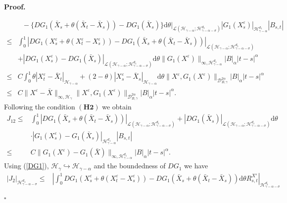 \documentclass[10pt,a4paper]{article}
\numberwithin{equation}{section}
\newenvironment{proof}[1][\normalfont\bfseries Proof]{%
	\noindent #1.\hspace{0.5em}%
	\ignorespaces%
}{%
	\hfill $\square$%
	\par%
}
\begin{document}
\begin{proof}
\begin{align}
		&~~~-\{ DG_1(\bar{X}_s+\theta (\bar{X}_t-\bar{X}_s))-DG_1(\bar{X}_s)\} \mathrm{d} \theta \bigg|_{\mathcal L(\mathcal H_{\gamma-\alpha};\mathcal H_{\gamma-\alpha-\sigma}^{d_1})} |G_1(X_s^\varepsilon)|_{\mathcal H_{\gamma-\alpha}^{d_1} }  |B_{s,t}|   \nonumber\\	
		\leq &  \int_0^1 | DG_1(X_s^\varepsilon+\theta (X_t^\varepsilon-X_s^\varepsilon))-DG_1(\bar{X}_s+\theta (\bar{X}_t-\bar{X}_s)) |_{\mathcal L(\mathcal H_{\gamma-\alpha};\mathcal H_{\gamma-\alpha-\sigma}^{d_1}) }  \nonumber\\
		&+|DG_1(X_s^\varepsilon)-DG_1(\bar{X}_s) |_{\mathcal L(\mathcal H_{\gamma-\alpha};\mathcal H_{\gamma-\alpha-\sigma}^{d_1}) } \mathrm{d} \theta
		\|G_1(X^\varepsilon)\|_{\infty, \mathcal H_{\gamma-\alpha}^{d_1}}  |B|_{\alpha}  |t-s|^\alpha   \nonumber\\	
		\leq & C \int_0^1 \theta |X_t^\varepsilon-\bar{X}_t|_{\mathcal H_{\gamma-\alpha}}
		+(2-\theta) |X_s^\varepsilon-\bar{X}_s|_{\mathcal H_{\gamma-\alpha}} \mathrm{d} \theta  \|X^\varepsilon, G_1(X^\varepsilon)\|_{\mathcal{D}_{ B,\gamma}^{2\alpha}}
		|B|_{\alpha}  |t-s|^\alpha   \nonumber\\
		\leq & C \|X^\varepsilon-\bar{X}\|_{\infty, \mathcal H_{\gamma}}
		\|X^\varepsilon, G_1(X^\varepsilon)\|_{\mathcal{D}_{ B,\gamma}^{2\alpha}}
		|B|_{\alpha}  |t-s|^\alpha   .
	\end{align}
	Following the condition $(\mathbf{H2})$ we obtain
	\begin{align}\label{J12}
	J_{12} \leq & \int_0^1 |DG_1(\bar{X}_s+\theta (\bar{X}_t-\bar{X}_s))|_{\mathcal L(\mathcal H_{\gamma-\alpha};\mathcal H_{\gamma-\alpha-\sigma}^{d_1}) } +|DG_1(\bar{X}_s)|_{\mathcal L(\mathcal H_{\gamma-\alpha};\mathcal H_{\gamma-\alpha-\sigma}^{d_1}) } \mathrm{d} \theta \nonumber\\
		& \cdot |G_1(X_s^\varepsilon)-G_1(\bar{X}_s)|_{\mathcal H_{\gamma-\alpha}^{d_1}} |B_{s,t}|  \nonumber\\
		\leq & C \|G_1(X^\varepsilon)-G_1(\bar{X})\|_{\infty, \mathcal H_{\gamma-\alpha}^{d_1} } |B|_\alpha |t-s|^\alpha.
	\end{align}
	Using (\ref{DG1}), $\mathcal H_\gamma \hookrightarrow \mathcal H_{\gamma-\alpha}$ and the boundedness of $DG_1$ we have
	\begin{align}\label{remJ2}
		|J_2 |_{\mathcal H_{\gamma-\alpha-\sigma}^{d_1} }
		\leq & \left|\int_0^1 DG_1(X_s^\varepsilon+\theta (X_t^\varepsilon-X_s^\varepsilon))-DG_1(\bar{X}_s+\theta (\bar{X}_t-\bar{X}_s)) \mathrm{d} \theta R_{s,t}^{X^\varepsilon} \right|_{\mathcal H_{\gamma-\alpha-\sigma}^{d_1} } \nonumber\\

\end{align}
\end{proof}
\end{document}
